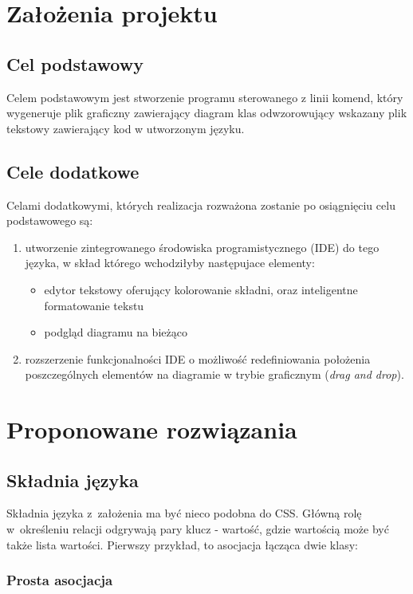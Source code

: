 \documentclass[a4paper,11pt]{article}
\begin{document}
\section{Założenia projektu}

\subsection{Cel podstawowy}
Celem podstawowym jest stworzenie programu sterowanego z linii komend, który wygeneruje plik
graficzny zawierający diagram klas odwzorowujący wskazany plik tekstowy zawierający kod w utworzonym
języku.

\subsection{Cele dodatkowe}
Celami dodatkowymi, których realizacja rozważona zostanie po osiągnięciu celu podstawowego są:
\begin{enumerate}
  \item{
    utworzenie zintegrowanego środowiska programistycznego (IDE) do tego języka, w skład którego
    wchodziłyby następujace elementy:
    \begin{itemize}
      \item{edytor tekstowy oferujący kolorowanie składni, oraz inteligentne formatowanie tekstu}
      \item{podgląd diagramu na bieżąco}
    \end{itemize}
  }
  \item{rozszerzenie funkcjonalności IDE o możliwość redefiniowania położenia poszczególnych
    elementów na diagramie w trybie graficznym (\emph{drag and drop}).}
\end{enumerate}
\section{Proponowane rozwiązania}
\subsection{Składnia języka}
Składnia języka z~założenia ma być nieco podobna do CSS. Główną rolę w~określeniu relacji odgrywają
pary klucz - wartość, gdzie wartością może być także lista wartości. Pierwszy przykład, to asocjacja
łącząca dwie klasy:

\subsubsection{Prosta asocjacja}

\end{document}
